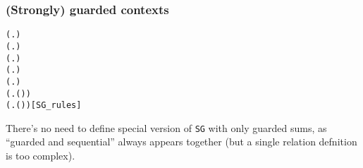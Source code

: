 \begin{frame}[fragile]
\frametitle{(Strongly) guarded contexts}
\begin{alltt}
 (\HOLTokenLambda{}. )
  \HOLSymConst{\HOLTokenImp{}}  (\HOLTokenLambda{}.   )
  \HOLSymConst{\HOLTokenImp{}}  (\HOLTokenLambda{}.  )
  \HOLSymConst{\HOLTokenConj{}}   \HOLSymConst{\HOLTokenImp{}}  (\HOLTokenLambda{}.   \HOLSymConst{\ensuremath{+}}  )
  \HOLSymConst{\HOLTokenConj{}}   \HOLSymConst{\HOLTokenImp{}}  (\HOLTokenLambda{}.   \HOLSymConst{\ensuremath{\parallel}}  )
  \HOLSymConst{\HOLTokenImp{}}  (\HOLTokenLambda{}. \HOLSymConst{\ensuremath{\nu}}  ( ))
  \HOLSymConst{\HOLTokenImp{}}  (\HOLTokenLambda{}.  ( ) )\hfill{[SG_rules]}
\end{alltt}
There's no need to define special version of \texttt{SG} with only
guarded sums, as ``guarded and sequential'' always appears together
(but a single relation defnition is too complex).
\end{frame}

